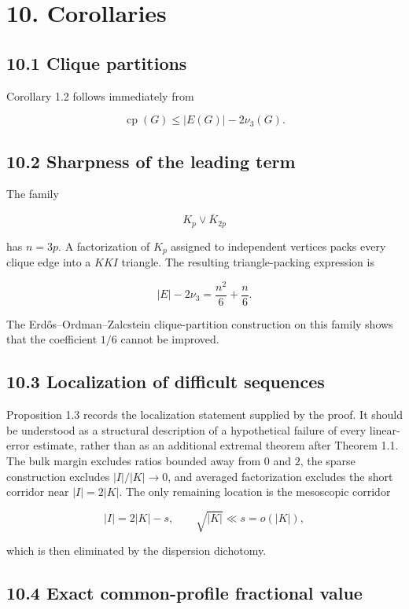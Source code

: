 \documentclass[
  11pt,
]{article}
\begin{document}
\section{10. Corollaries}\label{corollaries}

\subsection{10.1 Clique partitions}\label{clique-partitions}

Corollary 1.2 follows immediately from

\[
\operatorname{cp}(G)
\le
|E(G)|-2\nu_3(G).
\]

\subsection{10.2 Sharpness of the leading term}\label{sharpness-of-the-leading-term}

The family

\[
K_p\vee\overline K_{2p}
\]

has \(n=3p\). A factorization of \(K_p\) assigned to independent vertices packs every clique edge into a \(KKI\) triangle. The resulting triangle-packing expression is

\[
|E|-2\nu_3
=
\frac{n^2}{6}+\frac n6.
\tag{10.1}
\]

The Erdős--Ordman--Zalcstein clique-partition construction on this family shows that the coefficient \(1/6\) cannot be improved.

\subsection{10.3 Localization of difficult sequences}\label{localization-of-difficult-sequences}

Proposition 1.3 records the localization statement supplied by the proof. It should be understood as a structural description of a hypothetical failure of every linear-error estimate, rather than as an additional extremal theorem after Theorem 1.1. The bulk margin excludes ratios bounded away from \(0\) and \(2\), the sparse construction excludes \(|I|/|K|\to0\), and averaged factorization excludes the short corridor near \(|I|=2|K|\). The only remaining location is the mesoscopic corridor

\[
|I|=2|K|-s,
\qquad
\sqrt{|K|}\ll s=o(|K|),
\]

which is then eliminated by the dispersion dichotomy.

\subsection{10.4 Exact common-profile fractional value}\label{exact-common-profile-fractional-value}
\end{document}
